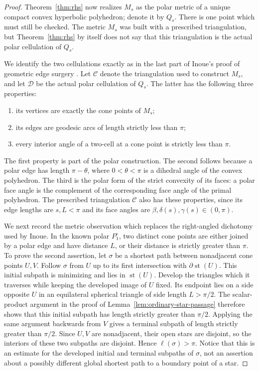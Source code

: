 \documentclass[12pt,a4paper]{article}
\theoremstyle{definition}
\begin{document}
\begin{proof}
Theorem~\ref{thm:rhs} now realizes \(M_s\) as the polar metric of a unique
compact convex hyperbolic polyhedron; denote it by \(Q_s\).  There is one
point which must still be checked.  The metric \(M_s\) was built with a
prescribed triangulation, but Theorem~\ref{thm:rhs} by itself does not say
that this triangulation is the actual polar cellulation of \(Q_s\).

We identify the two cellulations exactly as in the last part of Inoue's proof
of geometric edge surgery \cite[proof of Theorem~8.2]{Inoue2008}. Let
\(\mathcal C\) denote the triangulation used to construct \(M_s\), and let
\(\mathcal D\) be the actual polar cellulation of \(Q_s\). The latter has the
following three properties:
\begin{enumerate}[label=\textup{(C\arabic*)},itemsep=0.15em,topsep=0.3em]
\item its vertices are exactly the cone points of \(M_s\);
\item its edges are geodesic arcs of length strictly less than \(\pi\);
\item every interior angle of a two-cell at a cone point is strictly less than
\(\pi\).
\end{enumerate}
The first property is part of the polar construction. The second follows
because a polar edge has length \(\pi-\theta\), where
\(0<\theta<\pi\) is a dihedral angle of the convex polyhedron. The third is
the polar form of the strict convexity of its faces: a polar face angle is the
complement of the corresponding face angle of the primal polyhedron. The
prescribed triangulation \(\mathcal C\) also has these properties, since its
edge lengths are \(s,L<\pi\) and its face angles are
\(\beta,\delta(s),\gamma(s)\in(0,\pi)\).

We next record the metric observation which replaces the right-angled
dichotomy used by Inoue. In the known polar \(P_1^\circ\), two distinct cone
points are either joined by a polar edge and have distance \(L\), or their
distance is strictly greater than \(\pi\). To prove the second assertion, let
\(\sigma\) be a shortest path between nonadjacent cone points \(U,V\). Follow
\(\sigma\) from \(U\) up to its first intersection with
\(\partial\operatorname{st}(U)\). This initial subpath is minimizing and lies
in \(\operatorname{st}(U)\). Develop the triangles which it traverses while
keeping the developed image of \(U\) fixed. Its endpoint lies on a side
opposite \(U\) in an equilateral spherical triangle of side length
\(L>\pi/2\). The scalar-product argument in the proof of
Lemma~\ref{lem:ordinary-star-passage} therefore shows that this initial
subpath has length strictly greater than \(\pi/2\). Applying the same argument
backwards from \(V\) gives a terminal subpath of length strictly greater than
\(\pi/2\). Since \(U,V\) are nonadjacent, their open stars are disjoint, so
the interiors of these two subpaths are disjoint. Hence
\(\ell(\sigma)>\pi\). Notice that this is an estimate for the developed
initial and terminal subpaths of \(\sigma\), not an assertion about a
possibly different global shortest path to a boundary point of a star.


\end{proof}
\end{document}
